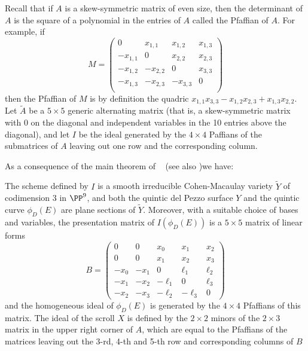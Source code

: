\begin{fact}

Recall that if $A$ is a skew-symmetric matrix of even size,
then the determinant of $A$ is the square of a polynomial in the entries of $A$ called the Pfaffian of $A$. For example, if
$$
M = \begin{pmatrix}
0&x_{1,1}&x_{1,2}&x_{1,3}\\
-x_{1,1}&0&x_{2,2}&x_{2,3}\\
-x_{1,2}&-x_{2,2}&0&x_{3,3}\\
-x_{1,3}&-x_{2,3}&-x_{3,3}&0\\
\end{pmatrix}
$$
then the Pfaffian of $M$ is by definition the quadric $x_{1,1}x_{3,3}-x_{1,2}x_{2,3}+x_{1,3}x_{2,2}$.
Let $\tilde A$ be a $5\times 5$ generic alternating matrix (that is, a skew-symmetric matrix with 0 on the diagonal and independent variables
in the 10 entries above the diagonal), and let $I$ be the ideal generated by the $4\times 4$ Paffians of
the submatrices of $A$ leaving out one row and the corresponding column.

As a consequence of the main theorem of ~\cite{MR453723} (see also \cite[Theorem 11]{Eisenbud1995})we have:

\begin{proposition} \label{5x5 Pfaffians}

The scheme defined by $I$ is a smooth irreducible Cohen-Macaulay variety $\tilde Y$ of codimension 3 in $\PP^9$,
and both the quintic del Pezzo surface $Y$ and the quintic curve $\phi_D(E)$ are plane sections of $\tilde Y$.
Moreover, with a suitable choice of bases and variables,  the presentation matrix of $I(\phi_D(E))$ is
a $5\times 5$ matrix of linear forms 
$$
B =\begin{pmatrix}
0&0&x_0&x_1&x_2\\
0&0&x_1&x_2&x_3\\
-x_0&-x_1&0&\ell_1&\ell_2\\
-x_1&-x_2&-\ell_1&0&\ell_3\\
-x_2&-x_3&-\ell_2&-\ell_3&0
\end{pmatrix}
$$
and
the homogeneous ideal of $\phi_D(E)$ is generated by the  $4\times 4$ Pfaffians of this matrix. The ideal of 
the scroll $X$ is defined by the $2\times 2$ minors of the $2\times 3$ matrix in the upper right corner of $A$, which
are equal to the Pfaffians of the matrices leaving out the 3-rd, 4-th and 5-th row and corresponding columns of $B$
\end{proposition}
\end{fact}

